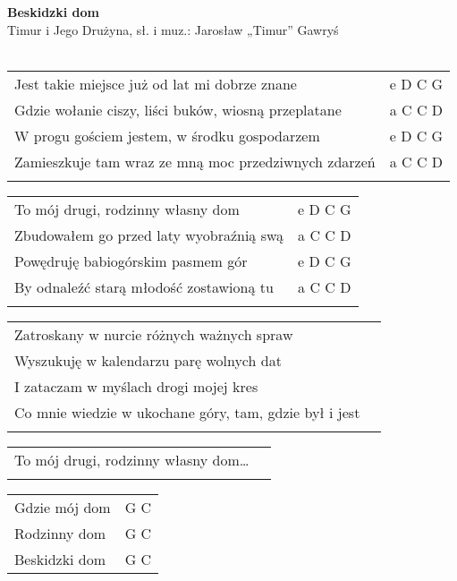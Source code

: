 \documentclass[a5paper]{article}
\begin{document}


\noindent
\fontsize{12pt}{15pt}\selectfont
\textbf{Beskidzki dom} \\
\fontsize{8pt}{10pt}\selectfont
Timur i Jego Drużyna, sł. i muz.: Jarosław „Timur” Gawryś \\ \\
\fontsize{10pt}{12pt}\selectfont
{}
\begin{tabular}{@{}p{9.50cm}p{3cm}@{}}
\noindent
Jest takie miejsce już od lat mi dobrze znane & e D C G \\
Gdzie wołanie ciszy, liści buków, wiosną przeplatane & a C C D \\
W progu gościem jestem, w środku gospodarzem & e D C G \\
Zamieszkuje tam wraz ze mną moc przedziwnych zdarzeń & a C C D \\\\
\end{tabular}

\noindent
\begin{tabular}{@{}p{8.50cm}p{3cm}@{}}
To mój drugi, rodzinny własny dom & e D C G \\
Zbudowałem go przed laty wyobraźnią swą & a C C D \\
Powędruję babiogórskim pasmem gór & e D C G \\
By odnaleźć starą młodość zostawioną tu & a C C D \\ \\
\end{tabular}

\noindent
\begin{tabular}{@{}p{11.50cm}p{3cm}@{}}
Zatroskany w nurcie różnych ważnych spraw \\
Wyszukuję w kalendarzu parę wolnych dat \\
I zataczam w myślach drogi mojej kres \\
Co mnie wiedzie w ukochane góry, tam, gdzie był i jest \\ \\
\end{tabular}

\noindent
\begin{tabular}{@{}p{9.50cm}p{3cm}@{}}
To mój drugi, rodzinny własny dom… \\ \\
\end{tabular}

\noindent
\begin{tabular}{@{}p{7.50cm}p{3cm}@{}}
Gdzie mój dom & G C \\
Rodzinny dom & G C  \\
Beskidzki dom & G C 
\end{tabular}
\end{document}
